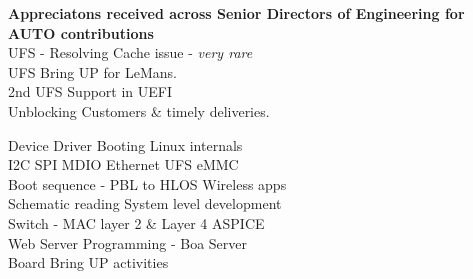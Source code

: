 \footnotesize{
   \textbf{Appreciatons received across Senior Directors of Engineering for AUTO contributions} \\
   \textbullet UFS - Resolving Cache issue - \emph{very rare} \\
   \textbullet UFS \textendash{} Bring UP for LeMans. \\
   \textbullet 2nd UFS Support in UEFI \\
   \textbullet Unblocking Customers \& timely deliveries.
}


   \textbullet Device Driver \textbullet Booting \textbullet Linux internals \\
   \textbullet I2C \textbullet SPI \textbullet MDIO \textbullet Ethernet \textbullet UFS \textbullet eMMC \\ 
   \textbullet Boot sequence - PBL to HLOS \textbullet Wireless apps\\
   \textbullet Schematic reading \textbullet System level development \\
   \textbullet Switch - MAC layer 2 \& Layer 4 \textbullet ASPICE \\
   \textbullet Web Server Programming - Boa Server \\
   \textbullet Board Bring UP activities \\

